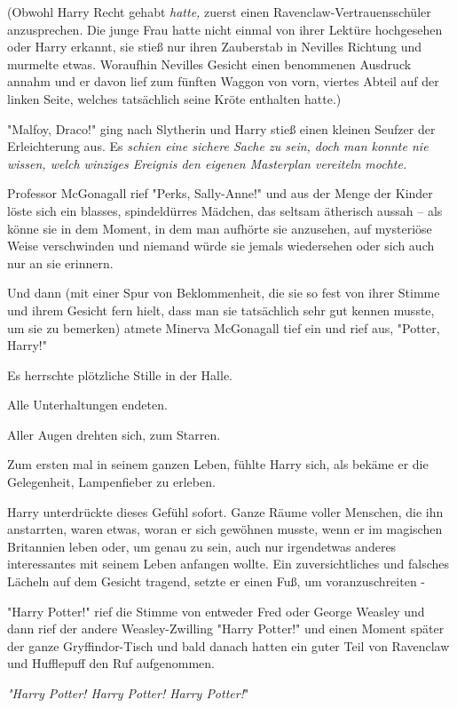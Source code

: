 {(Obwohl Harry Recht gehabt \emph{hatte,} zuerst einen Ravenclaw-Vertrauensschüler anzusprechen. Die junge Frau hatte nicht einmal von ihrer Lektüre hochgesehen oder Harry erkannt, sie stieß nur ihren Zauberstab in Nevilles Richtung und murmelte etwas. Woraufhin Nevilles Gesicht einen benommenen Ausdruck annahm und er davon lief zum fünften Waggon von vorn, viertes Abteil auf der linken Seite, welches tatsächlich seine Kröte enthalten hatte.)

"Malfoy, Draco!" ging nach Slytherin und Harry stieß einen kleinen Seufzer der Erleichterung aus. Es \emph{schien eine sichere Sache zu sein, doch man konnte nie wissen, welch winziges Ereignis den eigenen Masterplan vereiteln mochte.}

Professor McGonagall rief "Perks, Sally-Anne!" und aus der Menge der Kinder löste sich ein blasses, spindeldürres Mädchen, das seltsam ätherisch aussah -- als könne sie in dem Moment, in dem man aufhörte sie anzusehen, auf mysteriöse Weise verschwinden und niemand würde sie jemals wiedersehen oder sich auch nur an sie erinnern.

Und dann (mit einer Spur von Beklommenheit, die sie so fest von ihrer Stimme und ihrem Gesicht fern hielt, dass man sie tatsächlich sehr gut kennen musste, um sie zu bemerken) atmete Minerva McGonagall tief ein und rief aus, "Potter, Harry!"

Es herrschte plötzliche Stille in der Halle.

Alle Unterhaltungen endeten.

Aller Augen drehten sich, zum Starren.

Zum ersten mal in seinem ganzen Leben, fühlte Harry sich, als bekäme er die Gelegenheit, Lampenfieber zu erleben.

Harry unterdrückte dieses Gefühl sofort. Ganze Räume voller Menschen, die ihn anstarrten, waren etwas, woran er sich gewöhnen musste, wenn er im magischen Britannien leben oder, um genau zu sein, auch nur irgendetwas anderes interessantes mit seinem Leben anfangen wollte. Ein zuversichtliches und falsches Lächeln auf dem Gesicht tragend, setzte er einen Fuß, um voranzuschreiten -

"Harry Potter!" rief die Stimme von entweder Fred oder George Weasley und dann rief der andere Weasley-Zwilling "Harry Potter!" und einen Moment später der ganze Gryffindor-Tisch und bald danach hatten ein guter Teil von Ravenclaw und Hufflepuff den Ruf aufgenommen.

\emph{"Harry Potter! Harry Potter! Harry Potter!}"

}
